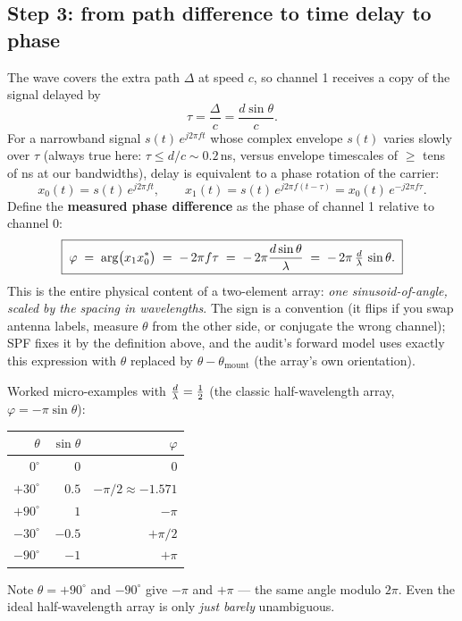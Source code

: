 \subsection{Step 3: from path difference to time delay to phase}
\label{sec:phase}

The wave covers the extra path $\Delta$ at speed $c$, so channel 1 receives a
copy of the signal delayed by
\[
\tau = \frac{\Delta}{c} = \frac{d\sin\theta}{c}.
\]
For a narrowband signal $s(t)\,e^{j2\pi f t}$ whose complex envelope $s(t)$
varies slowly over $\tau$ (always true here: $\tau \le d/c \sim 0.2$\,ns,
versus envelope timescales of $\ge$ tens of ns at our bandwidths), delay is
equivalent to a phase rotation of the carrier:
\[
x_0(t) = s(t)\, e^{j 2\pi f t}, \qquad
x_1(t) = s(t)\, e^{j 2\pi f (t - \tau)}
       = x_0(t)\, e^{-j 2\pi f \tau}.
\]
Define the \textbf{measured phase difference} as the phase of channel 1
relative to channel 0:
\[
\boxed{\;
\varphi \;=\; \arg\!\big(x_1 x_0^{*}\big)
        \;=\; -\,2\pi f \tau
        \;=\; -\,2\pi \frac{d \sin\theta}{\lambda}
        \;=\; -\,2\pi\,\tfrac{d}{\lambda}\,\sin\theta .
\;}
\]
This is the entire physical content of a two-element array: \emph{one
sinusoid-of-angle, scaled by the spacing in wavelengths}. The sign is a
convention (it flips if you swap antenna labels, measure $\theta$ from the
other side, or conjugate the wrong channel); SPF fixes it by the definition
above, and the audit's forward model uses exactly this expression with
$\theta$ replaced by $\theta - \theta_{\mathrm{mount}}$ (the array's own
orientation).

Worked micro-examples with $\tfrac{d}{\lambda} = \tfrac12$ (the classic half-wavelength
array, $\varphi = -\pi\sin\theta$):
\begin{center}
\begin{tabular}{rrr}
\toprule
$\theta$ & $\sin\theta$ & $\varphi$ \\
\midrule
$0^\circ$   & $0$     & $0$ \\
$+30^\circ$ & $0.5$   & $-\pi/2 \approx -1.571$ \\
$+90^\circ$ & $1$     & $-\pi$ \\
$-30^\circ$ & $-0.5$  & $+\pi/2$ \\
$-90^\circ$ & $-1$    & $+\pi$ \\
\bottomrule
\end{tabular}
\end{center}
Note $\theta = +90^\circ$ and $-90^\circ$ give $-\pi$ and $+\pi$ --- the same
angle modulo $2\pi$. Even the ideal half-wavelength array is only
\emph{just barely} unambiguous.

